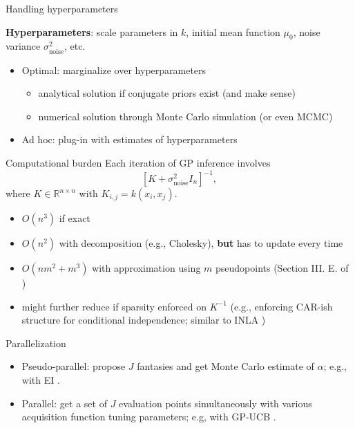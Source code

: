\documentclass[aspectratio=169]{beamer}					%
\begin{document}
\begin{frame}{Handling hyperparameters}
	
	\textbf{Hyperparameters}: scale parameters in $k$, initial mean function $\mu_0$, noise variance $\sigma^2_{\text{noise}}$, etc.
	
	\vspace{1em}
	
	\begin{itemize}
		\item Optimal: marginalize over hyperparameters
		\begin{itemize}
			\item analytical solution if conjugate priors exist (and make sense)
			\item numerical solution through Monte Carlo simulation (or even MCMC)
		\end{itemize}
	\item Ad hoc: plug-in with estimates of hyperparameters
	\end{itemize}
	
\end{frame}

\begin{frame}{Computational burden}
	Each iteration of GP inference involves 
	\begin{equation*}
		\left[K + \sigma^2_{\text{noise}}I_n\right]^{-1},
	\end{equation*}
where $K \in \mathbb{R}^{n \times n}$ with $K_{i,j} = k(x_i, x_j)$. 	

\pause
\vspace{1em}

\begin{itemize}
	\item $O(n^3)$ if exact
	\item $O(n^2)$ with decomposition (e.g., Cholesky), \textbf{but} has to update every time
	\item $O(nm^2 + m^3)$ with approximation using $m$ pseudopoints (Section III. E. of \cite{shahriari2015taking}) 
	\item might further reduce if sparsity enforced on $K^{-1}$ (e.g., enforcing CAR-ish structure for conditional independence; similar to INLA \cite{rue2017bayesian})
\end{itemize}
\end{frame}

\begin{frame}{Parallelization}
	
	\begin{itemize}
		\item Pseudo-parallel: propose $J$ fantasies and get Monte Carlo estimate of $\alpha$; e.g., with EI \cite{snoek2012practical}. 
		\item Parallel: get a set of $J$ evaluation points simultaneously with various acquisition function tuning parameters; e.g, with GP-UCB \cite{hutter2012parallel, jones2001taxonomy}. 
		\end{itemize}
	
\end{frame}
\end{document}
